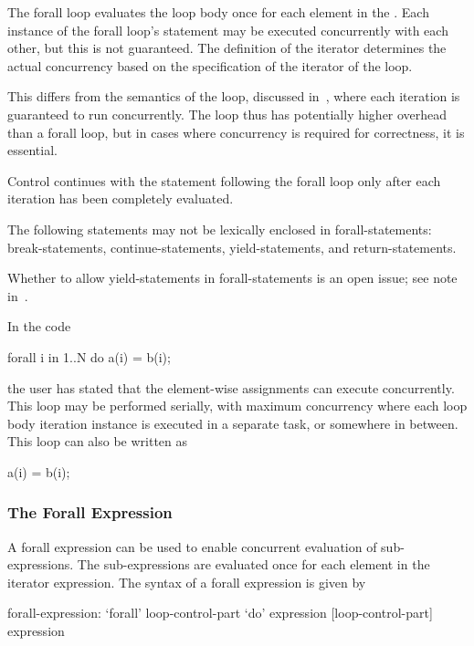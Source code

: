The forall loop evaluates the loop body once for each element in
the .  Each instance of the forall loop's
statement may be executed concurrently with each other, but this is
not guaranteed.  The definition of the iterator determines the actual
concurrency based on the specification of the iterator of the loop.

This differs from the semantics of the  loop, discussed
in~, where each iteration is guaranteed to run
concurrently.  The  loop thus has potentially higher
overhead than a forall loop, but in cases where concurrency is
required for correctness, it is essential.

Control continues with the statement following the forall loop only
after each iteration has been completely evaluated.

The following statements may not be lexically enclosed in
forall-statements: break-statements, continue-statements,
yield-statements, and return-statements.

\begin{openissue}
Whether to allow yield-statements in forall-statements is an open
issue; see note in~.
\end{openissue}

\begin{example}
In the code
\begin{chapel}
forall i in 1..N do
  a(i) = b(i);
\end{chapel}
the user has stated that the element-wise assignments can execute
concurrently.  This loop may be performed serially, with maximum
concurrency where each loop body iteration instance is executed in a
separate task, or somewhere in between.  This loop can also be written
as
\begin{chapel}
[i in 1..N] a(i) = b(i);
\end{chapel}
\end{example}

\subsubsection{The Forall Expression}
\label{Forall_Expressions}

A forall expression can be used to enable concurrent evaluation of
sub-expressions.  The sub-expressions are evaluated once for each
element in the iterator expression.  The syntax of a forall expression
is given by
\begin{syntax}
forall-expression:
  `forall' loop-control-part `do' expression
  [loop-control-part] expression
\end{syntax}

